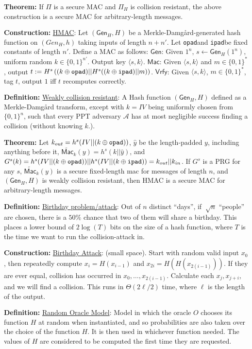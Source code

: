 \documentclass[10pt]{article}
\newcommand{\AAA}{\mathcal{A}}
\newcommand{\defn}[1]{{\bf Definition:} \underline{#1}}
\newcommand{\thm}[1]{{\bf Theorem:} \underline{#1}}
\newcommand{\con}[1]{{\bf Construction:} \underline{#1}}
\newcommand{\Mac}{\mathsf{Mac}}
\newcommand{\Vrfy}{\mathsf{Vrfy}}
\newcommand{\Gen}{\mathsf{Gen}}
\newcommand{\ang}[1]{\langle#1\rangle}
\newcommand{\xor}{\oplus}
\newcommand{\opad}{{\tt opad}}
\newcommand{\ipad}{{\tt ipad}}
\newcommand{\from}{\leftarrow}
\begin{document}
\begin{multicols}{5}
\thm{}If $\Pi$ is a secure MAC and $\Pi_H$ is collision resistant, the above construction is a secure MAC for arbitrary-length messages.

\con{HMAC}: Let $(\Gen_H,H)$ be a Merkle-Damg\r{a}rd-generated hash function on $(Gen_H,h)$ taking inputs of length $n+n'$. Let \opad and \ipad be fixed constants of length $n'$. Define a MAC as follows: $\Gen$: Given $1^n$, $s\from\Gen_H(1^n)$, uniform random $k\in\{0,1\}^{n'}$. Output key $\ang{s,k}$. $\Mac$: Given $\ang{s,k}$ and $m\in\{0,1\}^*$, output $t:=H^s\left((k\xor\opad)||H^s((k\xor\ipad)||m)\right)$. $\Vrfy$: Given $\ang{s,k}$, $m\in\{0,1\}^*$, tag $t$, output $1$ iff $t$ recomputes correctly.

\defn{Weakly collision resistant}: A Hash function $(\Gen_H, H)$ defined as a Merkle-Damg\r{a}rd transform, except with $k=IV$ being uniformly chosen from $\{0,1\}^n$, such that every PPT adversary $\AAA$ has at most negligible success finding a collision (without knowing $k$.).

\thm{}Let $k_{out}=h^s(IV||(k\xor\opad))$, $\hat{y}$ be the length-padded $y$, including anything before it, $\widetilde{\Mac}_k(y)=h^s(k||\hat{y})$, and $G^s(k)=h^s(IV||(k\xor\opad))||h^s(IV||(k\xor\ipad))=k_{out}||k_{in}$. If $G^s$ is a PRG for any $s$, $\widetilde{\Mac}_k(y)$ is a secure fixed-length mac for messages of length $n$, and $(\Gen_H,H)$ is weakly collision resistant, then HMAC is a secure MAC for arbitrary-length messages.

\defn{Birthday problem/attack}: Out of $n$ distinct ``days'', if $~\sqrt{n}$ ``people'' are chosen, there is a $50\%$ chance that two of them will share a birthday. This places a lower bound of $2\log(T)$ bits on the size of a hash function, where $T$ is the time we want to run the collision-attack in.

\con{Birthday Attack}: (small space). Start with random valid input $x_0$, then repeatedly compute $x_i=H(x_{i-1})$ and $x_{2i}=H(H(x_{2(i-1)}))$. If they are ever equal, collision has occurred in $x_0,\dots,x_{2(i-1)}$. Calculate each $x_j,x_{j+i}$, and we will find a collision. This runs in $\Theta(2{\ell/2})$ time, where $\ell$ is the length of the output.

\defn{Random Oracle Model}: Model in which the oracle $O$ chooses its function $H$ at random when instantiated, and so probabilities are also taken over the choice of the function $H$. It is then used in whichever function needed. The values of $H$ are considered to be computed the first time they are requested.


\end{multicols}
\end{document}
